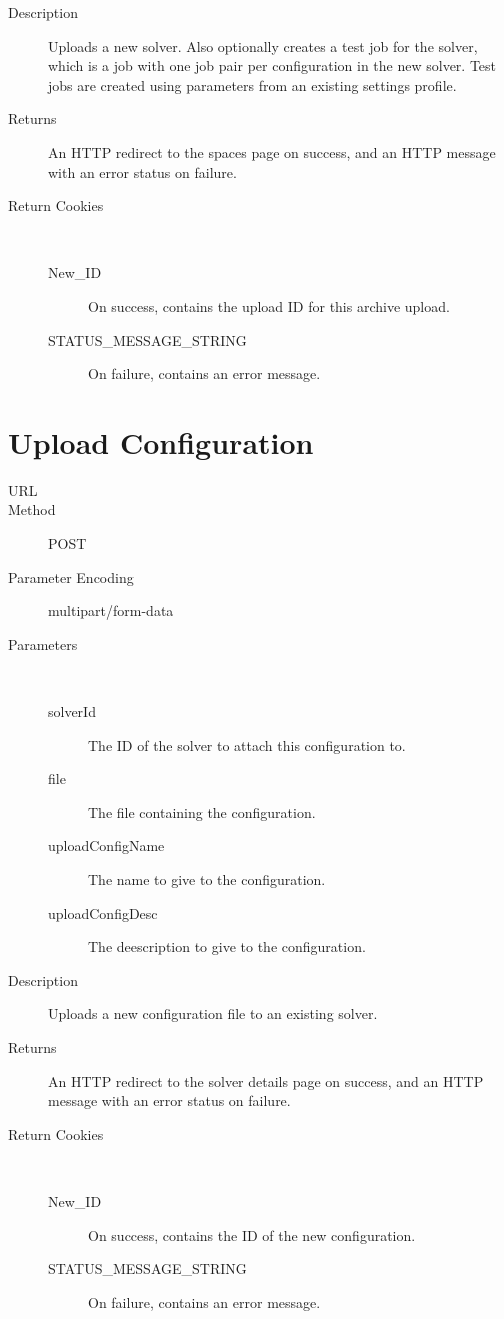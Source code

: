 \begin{description}
\begin{description}
	\end{description}
\item [Description] Uploads a new solver. Also optionally creates a test job for the solver, which is a job with one job pair per configuration in the new solver. Test jobs are created using parameters from an existing settings profile.
\item [Returns] An HTTP redirect to the spaces page on success, and an HTTP message with an error status on failure.
\item [Return Cookies] \
	\begin{description}
	\item [New\_ID]  On success, contains the upload ID for this archive upload.
	\item [STATUS\_MESSAGE\_STRING] \type{String} On failure, contains an error message.
	\end{description}
\end{description}

\section{Upload Configuration}
\begin{description}
\item [URL] 
\item [Method] POST
\item [Parameter Encoding] multipart/form-data
\item [Parameters] \
	\begin{description}
	\item [solverId]  The ID of the solver to attach this configuration to.
	\item [file]  The file containing the configuration.
	\item [uploadConfigName]  The name to give to the configuration.
	\item [uploadConfigDesc] \type{String} The deescription to give to the configuration.
	\end{description}
\item [Description] Uploads a new configuration file to an existing solver.
\item [Returns] An HTTP redirect to the solver details page on success, and an HTTP message with an error status on failure.
\item [Return Cookies] \
	\begin{description}
	\item [New\_ID] \type{Integer} On success, contains the ID of the new configuration.
	\item [STATUS\_MESSAGE\_STRING]  On failure, contains an error message.
	\end{description}
\end{description}

